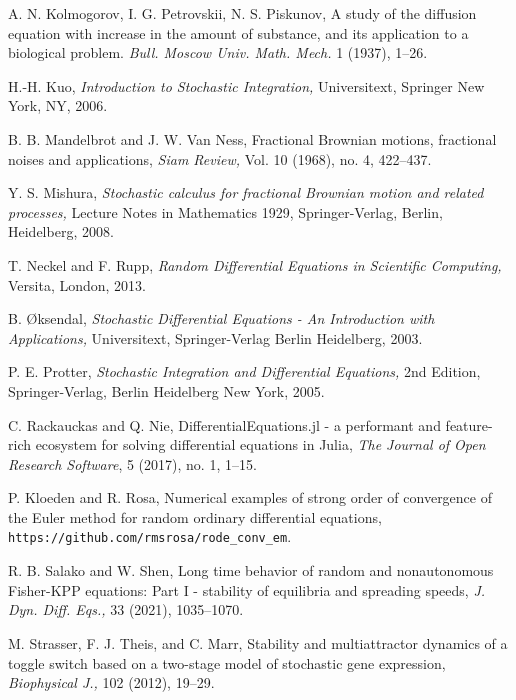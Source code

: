\documentclass[reqno,12pt]{amsart}
\theoremstyle{plain} %
\theoremstyle{definition} %
\begin{document}
\begin{thebibliography}{25}
     A. N. Kolmogorov, I. G. Petrovskii, N. S. Piskunov, A study of the diffusion equation with increase in the amount of substance, and its application to a biological problem. \emph{Bull. Moscow Univ. Math. Mech.} 1 (1937), 1--26.

     H.-H. Kuo, \emph{Introduction to Stochastic Integration,} Universitext, Springer New York, NY, 2006.

     B. B. Mandelbrot and J. W. Van Ness, Fractional Brownian motions, fractional noises and applications, \emph{Siam Review,} Vol. 10 (1968), no. 4, 422--437.

     Y. S. Mishura, \emph{Stochastic calculus for fractional Brownian motion and related processes,} Lecture Notes in Mathematics 1929, Springer-Verlag, Berlin, Heidelberg, 2008.

     T. Neckel and F. Rupp, \emph{Random Differential Equations in Scientific Computing,} Versita, London, 2013.

     B. {\O}ksendal, \emph{Stochastic Differential Equations - An Introduction with Applications,} Universitext, Springer-Verlag Berlin Heidelberg, 2003.

     P. E. Protter, \emph{Stochastic Integration and Differential Equations,} 2nd Edition, Springer-Verlag, Berlin Heidelberg New York, 2005.

     C. Rackauckas and Q. Nie, DifferentialEquations.jl - a performant and feature-rich ecosystem for solving differential equations in Julia, \emph{The Journal of Open Research Software}, 5 (2017), no. 1, 1--15.

     P. Kloeden and R. Rosa, Numerical examples of strong order of convergence of the Euler method for random ordinary differential equations, \texttt{https://github.com/rmsrosa/rode\_conv\_em}.

     R. B. Salako and W. Shen, Long time behavior of random and nonautonomous Fisher-KPP equations: Part I - stability of equilibria and spreading speeds, \emph{J. Dyn. Diff. Eqs.,} 33 (2021), 1035--1070.

     M. Strasser, F. J. Theis, and C. Marr, Stability and multiattractor dynamics of a toggle switch based on a two-stage model of stochastic gene expression, \emph{Biophysical J.,} 102 (2012), 19--29.


\end{thebibliography}
\end{document}
